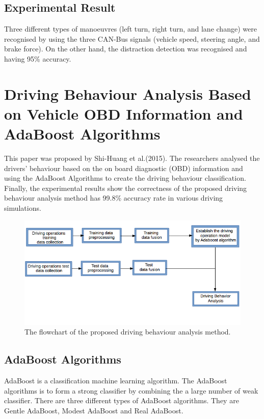 \subsection{Experimental Result}
Three different types of manoeuvres (left turn, right turn, and lane change) were recognised by using the three CAN-Bus signals (vehicle speed, steering angle, and brake force). On the other hand, the distraction detection was recognised and having 95\% accuracy.


\section{Driving Behaviour Analysis Based on Vehicle OBD Information and AdaBoost Algorithms}
This paper was proposed by Shi-Huang et al.(2015). The researchers analysed the drivers' behaviour based on the on board diagnostic (OBD) information and using the AdaBoost Algorithms to create the driving  behaviour classification. Finally, the experimental results show the correctness of the proposed driving behaviour analysis method has 99.8\% accuracy rate in various driving simulations.

\begin{figure}[hbt!]\centering
\includegraphics[width=.75\textwidth]{image/adaboost_flowchart}
\caption{The flowchart of the proposed driving behaviour analysis method.}
\end{figure}

\subsection{AdaBoost Algorithms}
AdaBoost is a classification machine learning algorithm. The AdaBoost algorithms is to form a strong classifier by combining the a large number of weak classifier. There are three different types of AdaBoost algorithms. They are Gentle AdaBoost, Modest AdaBoost and Real AdaBoost.

